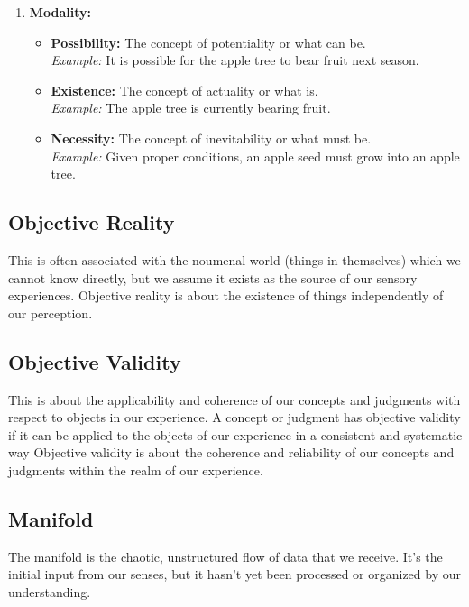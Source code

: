 \documentclass[a4paper]{article}
\begin{document}
\begin{enumerate}
\begin{itemize}
    \end{itemize}
    \item \textbf{Modality:}
    \begin{itemize}
        \item \textbf{Possibility:} The concept of potentiality or what can be. \\
        \textit{Example:} It is possible for the apple tree to bear fruit next season.
        \item \textbf{Existence:} The concept of actuality or what is. \\
        \textit{Example:} The apple tree is currently bearing fruit.
        \item \textbf{Necessity:} The concept of inevitability or what must be. \\
        \textit{Example:} Given proper conditions, an apple seed must grow into an apple tree.
    \end{itemize}
\end{enumerate}

\subsection{Objective Reality}
This is often associated with the noumenal world (things-in-themselves) which we cannot know directly, but we assume it exists as the source of our sensory experiences.
Objective reality is about the existence of things independently of our perception.

\subsection{Objective Validity}
This is about the applicability and coherence of our concepts and judgments with respect to objects in our experience.
A concept or judgment has objective validity if it can be applied to the objects of our experience in a consistent and systematic way
Objective validity is about the coherence and reliability of our concepts and judgments within the realm of our experience.

\subsection{Manifold}
The manifold is the chaotic, unstructured flow of data that we receive. 
It's the initial input from our senses, but it hasn't yet been processed or organized by our understanding.
\end{document}
